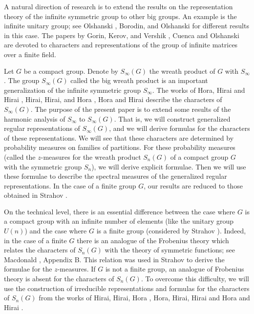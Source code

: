 \documentclass[12pt]{amsart}
\theoremstyle{definition}
\numberwithin{equation}{section}
\begin{document}
A natural direction of research is to extend the results on the representation theory
of the infinite symmetric group to other big groups. An example is the infinite
unitary group; see Olshanski \cite{OlshanskiUnitary}, Borodin, and Olshanski \cite{BorodinOlshanskiUnitary} for different results in this case.
The  papers by  Gorin, Kerov, and  Vershik \cite{GorinKerovVershik}, Cuenca and Olshanski \cite{CuencaOlshanski1}
are devoted to characters and  representations of the group of infinite matrices over a finite field.

Let $G$ be a compact group.  Denote by $S_{\infty}(G)$ the wreath product of $G$ with $S_{\infty}$.
The group $S_{\infty}(G)$ called the big wreath product is an important generalization of the infinite symmetric group $S_{\infty}$.
The works of Hora, Hirai and Hirai
\cite{HoraHiraiHiraiII}, Hirai, Hirai, and Hora \cite{HiraiHiraiHoraI},
Hora and Hirai \cite{HoraHirai} describe the characters of $S_{\infty}(G)$.
The purpose of the present paper is to extend some results of the harmonic analysis of $S_{\infty}$ to $S_{\infty}(G)$. That is, we will construct generalized regular representations
of $S_{\infty}(G)$, and we will derive formulas for the characters of these representations.
We will see that these characters are determined by probability measures on families of partitions.
For these probability measures (called the $z$-measures for the wreath product $S_n(G)$ of a compact group $G$ with the symmetric group $S_n$), we will derive explicit formulae. Then we will use these formulae to describe the spectral measures of the generalized regular representations.
In the case of a finite group $G$, our results are reduced to those obtained in Strahov \cite{StrahovIsr25}.

On the technical level, there is an essential difference between the case where
$G$ is a compact group with an infinite number of elements (like the unitary group $U(n)$) and the case where $G$ is a finite group (considered by Strahov \cite{StrahovIsr25}). Indeed, in the case of a finite $G$
there is an analogue of the Frobenius theory which relates the characters of $S_n(G)$
with the theory of symmetric functions; see Macdonald \cite{Macdonald}, Appendix B.
This relation was used in Strahov \cite{StrahovIsr25} to derive the formulae
for the $z$-measures. If $G$ is not a finite group, an analogue of Frobenius theory is absent for
the characters of $S_n(G)$. To overcome this difficulty, we will use the construction of irreducible representations and formulas for the characters of $S_n(G)$ from the works of Hirai, Hirai, Hora \cite{HiraiHiraiHoraI},
Hora, Hirai, Hirai \cite{HoraHiraiHiraiII} and Hora and Hirai \cite{HoraHirai}.
\end{document}
